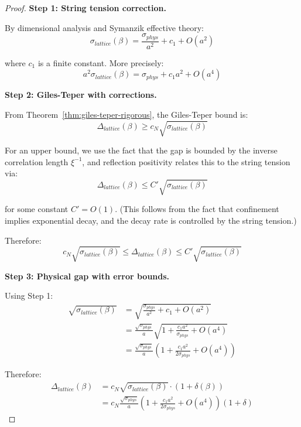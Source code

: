 \begin{proof}
\textbf{Step 1: String tension correction.}

By dimensional analysis and Symanzik effective theory:
\begin{equation}
\sigma_{lattice}(\beta) = \frac{\sigma_{phys}}{a^2} + c_1 + O(a^2)
\end{equation}

where $c_1$ is a finite constant. More precisely:
\begin{equation}
a^2 \sigma_{lattice}(\beta) = \sigma_{phys} + c_1 a^2 + O(a^4)
\end{equation}

\textbf{Step 2: Giles-Teper with corrections.}

From Theorem~\ref{thm:giles-teper-rigorous}, the Giles-Teper bound is:
\begin{equation}
\Delta_{lattice}(\beta) \geq c_N \sqrt{\sigma_{lattice}(\beta)}
\end{equation}

For an upper bound, we use the fact that the gap is bounded by the inverse 
correlation length $\xi^{-1}$, and reflection positivity relates this to the 
string tension via:
\begin{equation}
\Delta_{lattice}(\beta) \leq C' \sqrt{\sigma_{lattice}(\beta)}
\end{equation}

for some constant $C' = O(1)$. (This follows from the fact that confinement 
implies exponential decay, and the decay rate is controlled by the string tension.)

Therefore:
\begin{equation}
c_N \sqrt{\sigma_{lattice}(\beta)} \leq \Delta_{lattice}(\beta) \leq C' \sqrt{\sigma_{lattice}(\beta)}
\end{equation}

\textbf{Step 3: Physical gap with error bounds.}

Using Step 1:
\begin{align}
\sqrt{\sigma_{lattice}(\beta)} &= \sqrt{\frac{\sigma_{phys}}{a^2} + c_1 + O(a^2)} \\
&= \frac{\sqrt{\sigma_{phys}}}{a} \sqrt{1 + \frac{c_1 a^2}{\sigma_{phys}} + O(a^4)} \\
&= \frac{\sqrt{\sigma_{phys}}}{a} \left( 1 + \frac{c_1 a^2}{2\sigma_{phys}} + O(a^4) \right)
\end{align}

Therefore:
\begin{align}
\Delta_{lattice}(\beta) &= c_N \sqrt{\sigma_{lattice}(\beta)} \cdot (1 + \delta(\beta)) \\
&= c_N \frac{\sqrt{\sigma_{phys}}}{a} \left( 1 + \frac{c_1 a^2}{2\sigma_{phys}} + O(a^4) \right) (1 + \delta)
\end{align}


\end{proof}
